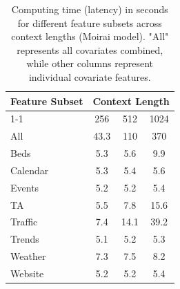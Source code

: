 \begin{table}[htbp]
\centering
\footnotesize
\begin{tabular}{lccc}
\toprule
\textbf{Feature Subset} & \multicolumn{3}{c}{\textbf{Context Length}} \\
\cmidrule{1-1} \cmidrule{2-4}
               & 256 & 512 & 1024 \\
\midrule
All            & 43.3 & 110 & 370 \\
Beds           & 5.3 & 5.6 & 9.9 \\
Calendar       & 5.3 & 5.4 & 5.6 \\
Events         & 5.2 & 5.2 & 5.4 \\
TA             & 5.5 & 7.8 & 15.6 \\
Traffic        & 7.4 & 14.1 & 39.2 \\
Trends         & 5.1 & 5.2 & 5.3 \\
Weather        & 7.3 & 7.5 & 8.2 \\
Website        & 5.2 & 5.2 & 5.4 \\
\bottomrule
\end{tabular}
\caption{Computing time (latency) in seconds for different feature subsets across context lengths (Moirai model). "All" represents all covariates combined, while other columns represent individual covariate features.}
\label{tab:latency_subset}
\end{table}
